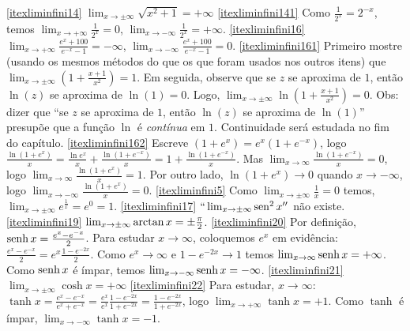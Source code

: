 \begin{exo}
\begin{sol}
\eqref{itexliminfini14} $\lim_{x\to\pm\infty}\sqrt{x^2+1}=+\infty$
\eqref{itexliminfini141} Como $\frac{1}{2^x}=2^{-x}$, temos $\lim_{x\to+\infty}\frac{1}{2^x}=0$, 
$\lim_{x\to-\infty}\frac{1}{2^x}=+\infty$.
\eqref{itexliminfini16}
$\lim_{x\to+\infty}\frac{e^x+100}{e^{-x}-1}=-\infty$,
$\lim_{x\to-\infty}\frac{e^x+100}{e^{-x}-1}=0$.
\eqref{itexliminfini161}  Primeiro mostre (usando os mesmos métodos do que os que foram
usados nos outros itens) que $\lim_{x\to \pm \infty}(1+\frac{x+1}{x^2})=1$. Em seguida,
observe que 
se $z$ se aproxima de $1$,  então $\ln(z)$ se aproxima de $\ln(1)=0$. Logo, $\lim_{x\to
\pm \infty}\ln(1+\frac{x+1}{x^2})=0$. Obs: dizer que ``se $z$ se aproxima de $1$, então
$\ln(z)$ se aproxima de $\ln(1)$'' presupõe que a função $\ln$ é \emph{contínua} em $1$.
Continuidade será estudada no fim do capítulo.
\eqref{itexliminfini162}  Escreve $(1+e^x)=e^x(1+e^{-x})$, logo
$\frac{\ln(1+e^x)}{x}=\frac{\ln
e^x}{x}+\frac{\ln(1+e^{-x})}{x}=1+\frac{\ln(1+e^{-x})}{x}$. Mas $\lim_{x\to
\infty}\frac{\ln(1+e^{-x})}{x}=0$, logo
$\lim_{x\to \infty}\frac{\ln(1+e^{x})}{x}=1$.
Por outro lado, $\ln(1+e^x)\to 0$  quando $x\to-\infty$, logo $\lim_{x\to
-\infty}\frac{\ln(1+e^{x})}{x}=0$.
\eqref{itexliminfini5} Como $\lim_{x\to\pm \infty}\frac{1}{x}=0$
temos, $\lim_{x\to\pm \infty}e^{\frac{1}{x}}=e^0=1$.
\eqref{itexliminfini17} $``\lim_{x\to \pm\infty}\operatorname{sen}^2x''$ não existe.
\eqref{itexliminfini19} $\lim_{x\to \pm\infty}\arctan
x=\pm\tfrac{\pi}{2}$.
\eqref{itexliminfini20} 
Por definição, $\operatorname{senh} x=\frac{e^x-e^{-x}}{2}$. Para estudar
$x\to\infty$, coloquemos $e^x$ em evidência:
$\frac{e^x-e^{-x}}{2}=e^x\frac{1-e^{-2x}}{2}$. Como $e^x\to\infty$ e
$1-e^{-2x}\to 1$ temos $\lim_{x\to \infty}\operatorname{senh} x=+\infty$. Como
$\operatorname{senh} x$ é ímpar, temos $\lim_{x\to -\infty}\operatorname{senh} x=-\infty$.
\eqref{itexliminfini21} $\lim_{x\to \pm\infty}\cosh x=+\infty$
\eqref{itexliminfini22} Para estudar, $x\to\infty$:
$\tanh x=\frac{e^x-e^{-x}}{e^x+e^{-x}}=\frac{e^x}{e^x}\frac{1-e^{-2x}}{1+e^{
-2x }}=\frac{1-e^{-2x}}{1+e^{
-2x }}$, logo $\lim_{x\to +\infty}\tanh x=+1$. Como $\tanh$ é ímpar,
$\lim_{x\to -\infty}\tanh x=-1$.
\end{sol}
\end{exo}



